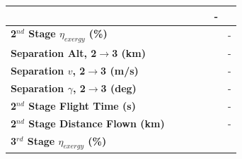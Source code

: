 \begin{table}[ht]
\begin{tabular}{l c c c c c c}
		& \firstsecondSeparationgammaISPThreeNinetyFiveNoReturn
		& \firstsecondSeparationgammaISPThreeStandardNoReturn
		& \firstsecondSeparationgammaISPThreeOneHundredFiveNoReturn
		& \firstsecondSeparationgammaISPThreeOneHundredTenNoReturn
		& -
		\\
		\hline 
		\textbf{2$^{nd}$ Stage $\eta_{exergy}$ (\%)}
		& \textbf{\secondExergyEffISPThreeNinetyNoReturn}
		& \textbf{\secondExergyEffISPThreeNinetyFiveNoReturn}
		& \textbf{\secondExergyEffISPThreeStandardNoReturn}
		& \textbf{\secondExergyEffISPThreeOneHundredFiveNoReturn}
		& \textbf{\secondExergyEffISPThreeOneHundredTenNoReturn}
		& -
		\\
		\textbf{Separation Alt, 2$\rightarrow$3 (km)}
		& \secondthirdSeparationAltISPThreeNinetyNoReturn
		& \secondthirdSeparationAltISPThreeNinetyFiveNoReturn
		& \secondthirdSeparationAltISPThreeStandardNoReturn
		& \secondthirdSeparationAltISPThreeOneHundredFiveNoReturn
		& \secondthirdSeparationAltISPThreeOneHundredTenNoReturn
		& -
		\\
		\textbf{Separation $v$, 2$\rightarrow$3 (m/s)}
		& \secondthirdSeparationvISPThreeNinetyNoReturn
		& \secondthirdSeparationvISPThreeNinetyFiveNoReturn
		& \secondthirdSeparationvISPThreeStandardNoReturn
		& \secondthirdSeparationvISPThreeOneHundredFiveNoReturn
		& \secondthirdSeparationvISPThreeOneHundredTenNoReturn
		& -
		\\
		\textbf{Separation $\gamma$, 2$\rightarrow$3 (deg)}
		& \secondthirdSeparationgammaISPThreeNinetyNoReturn
		& \secondthirdSeparationgammaISPThreeNinetyFiveNoReturn
		& \secondthirdSeparationgammaISPThreeStandardNoReturn
		& \secondthirdSeparationgammaISPThreeOneHundredFiveNoReturn
		& \secondthirdSeparationgammaISPThreeOneHundredTenNoReturn
		& -
		\\
		\textbf{2$^{nd}$ Stage Flight Time (s)}
		& \secondFlightTimeISPThreeNinetyNoReturn
		& \secondFlightTimeISPThreeNinetyFiveNoReturn
		& \secondFlightTimeISPThreeStandardNoReturn
		& \secondFlightTimeISPThreeOneHundredFiveNoReturn
		& \secondFlightTimeISPThreeOneHundredTenNoReturn
		& -
		\\
		\textbf{2$^{nd}$ Stage Distance Flown (km)}
		& \SecondDistISPThreeNinetyNoReturn
		& \SecondDistISPThreeNinetyFiveNoReturn
		& \SecondDistISPThreeStandardNoReturn
		& \SecondDistISPThreeOneHundredFiveNoReturn
		& \SecondDistISPThreeOneHundredTenNoReturn
		& -
		\\
		\hline 
		\textbf{3$^{rd}$ Stage $\eta_{exergy}$ (\%)}
		& \textbf{\thirddExergyEffISPThreeNinetyNoReturn}
		& \textbf{\thirddExergyEffISPThreeNinetyFiveNoReturn}

\end{tabular}
\end{table}
